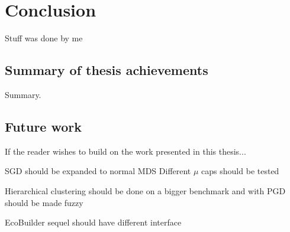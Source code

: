 \chapter{Conclusion}
\label{chap:conclusion}

Stuff was done by me

\section{Summary of thesis achievements}

Summary.

\section{Future work}
If the reader wishes to build on the work presented in this thesis...

SGD should be expanded to normal MDS
Different $\mu$ caps should be tested

Hierarchical clustering should be done on a bigger benchmark and with
PGD should be made fuzzy

EcoBuilder sequel should have different interface
